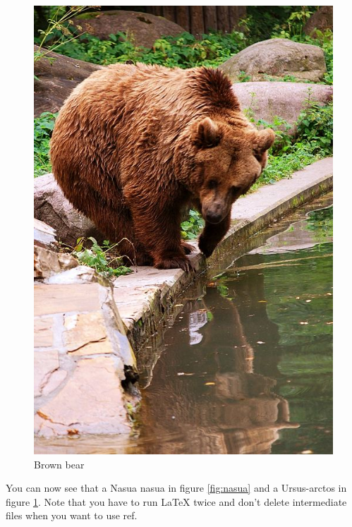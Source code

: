 \documentclass[a4paper]{scrreprt}
\begin{document}
\begin{figure}[ht]
\begin{minipage}[b]{0.45\linewidth}
        \includegraphics[width=\textwidth]{Ursus-arctos.jpg}
        \caption{Brown bear}
        \label{fig:Ursus-arctos}
    \end{minipage}
\end{figure}

You can now see that a Nasua nasua in figure \ref{fig:nasua} and a Ursus-arctos 
in figure \ref{fig:Ursus-arctos}. Note that you have to run LaTeX twice and
don't delete intermediate files when you want to use ref.
\end{document}
